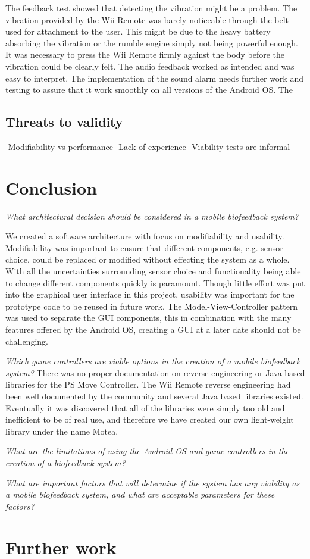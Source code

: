 The feedback test showed that detecting the vibration might be a problem. The vibration provided by the Wii Remote was barely noticeable through the belt used for attachment to the user. This might be due to the heavy battery absorbing the vibration or the rumble engine simply not being powerful enough. It was necessary to press the Wii Remote firmly against the body before the vibration could be clearly felt. The audio feedback worked as intended and was easy to interpret. The implementation of the sound alarm needs further work and testing to assure that it work smoothly on all versions of the Android OS.
The

\subsection{Threats to validity}
-Modifiability vs performance
-Lack of experience
-Viability tests are informal


\section{Conclusion}

\textit{What architectural decision should be considered in a mobile biofeedback system?}


We created a software architecture with focus on modifiability and usability. Modifiability was important to ensure that different components, e.g. sensor choice, could be replaced or modified without effecting the system as a whole. With all the uncertainties surrounding sensor choice and functionality being able to change different components quickly is paramount. Though little effort was put into the graphical user interface in this project, usability was important for the prototype code to be reused in future work. The Model-View-Controller pattern was used to separate the GUI components, this in combination with the many features offered by the Android OS, creating a GUI at a later date should not be challenging.

\textit{Which game controllers are viable options in the creation of a mobile biofeedback system?}
There was no proper documentation on reverse engineering or Java based libraries for the PS Move Controller. The Wii Remote reverse engineering had been well documented by the community and several Java based libraries existed. Eventually it was discovered that all of the libraries were simply too old and inefficient to be of real use, and therefore we have created our own light-weight library under the name Motea.

\textit{What are the limitations of using the Android OS and game controllers in the creation of a biofeedback system?}

\textit{What are important factors that will determine if the system has any viability as a mobile biofeedback system, and what are acceptable parameters for these factors?}


\section{Further work}